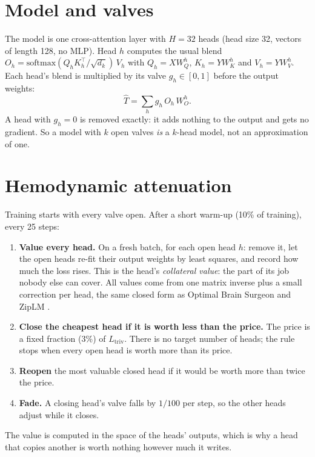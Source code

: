 \documentclass[11pt]{article}
\begin{document}
\section{Model and valves}

The model is one cross-attention layer with $H = 32$ heads (head size 32, vectors of length 128,
no MLP). Head $h$ computes the usual blend $O_h = \mathrm{softmax}(Q_h K_h^{\top}/\sqrt{d_k})\,V_h$
with $Q_h = X W_Q^h$, $K_h = Y W_K^h$ and $V_h = Y W_V^h$. Each head's blend is multiplied by its valve
$g_h \in [0, 1]$ before the output weights:
\begin{equation}
\hat T = \textstyle\sum_h g_h\, O_h\, W_O^h .
\end{equation}
A head with $g_h = 0$ is removed exactly: it adds nothing to the output and gets no gradient. So a
model with $k$ open valves \emph{is} a $k$-head model, not an approximation of one.

\section{Hemodynamic attenuation}
\label{sec:rule}

Training starts with every valve open. After a short warm-up (10\% of training), every 25 steps:
\begin{enumerate}
\item \textbf{Value every head.} On a fresh batch, for each open head $h$: remove it, let the open
      heads re-fit their output weights by least squares, and record how much the loss rises. This
      is the head's \emph{collateral value}: the part of its job nobody else can cover. All values
      come from one matrix inverse plus a small correction per head, the same closed form as
      Optimal Brain Surgeon \citep{obs} and ZipLM \citep{ziplm}.
\item \textbf{Close the cheapest head if it is worth less than the price.} The price is a fixed
      fraction (3\%) of $L_{\text{triv}}$. There is no target number of heads; the rule stops when
      every open head is worth more than its price.
\item \textbf{Reopen} the most valuable closed head if it would be worth more than twice the price.
\item \textbf{Fade.} A closing head's valve falls by $1/100$ per step, so the other heads adjust
      while it closes.
\end{enumerate}
The value is computed in the space of the heads' outputs, which is why a head that copies another
is worth nothing however much it writes.
\end{document}
